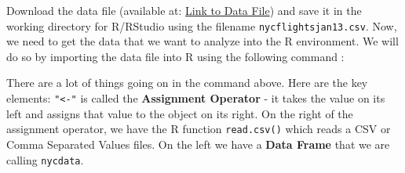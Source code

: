 \documentclass[11pt, letterpaper, twoside]{memoir}\usepackage{knitr}
\begin{document}
\begin{knitrout}
\color{fgcolor}\begin{kframe}
\begin{alltt}
\end{alltt}
\end{kframe}
\end{knitrout}

Download the data file (available at: \href{https://umich.box.com/s/xtpp98qygojc0fh14vhlvdr6nzsa47a2}{Link to Data File}) and save it in the working directory for R/RStudio using the filename \texttt{nycflightsjan13.csv}. Now, we need to get the data that we want to analyze into the R environment. We will do so by importing the data file into R using the following command :

\begin{knitrout}
\color{fgcolor}\begin{kframe}
\begin{alltt}
 \hlkwb{<-} \hlstd{(}\hlstd{)}
\end{alltt}
\end{kframe}
\end{knitrout}

There are a lot of things going on in the command above. Here are the key elements: \texttt{"<-"} is called the \textbf{Assignment Operator} - it takes the value on its left and assigns that value to the object on its right. On the right of the assignment operator, we have the R function \texttt{read.csv()} which reads a CSV or Comma Separated Values files. On the left we have a \textbf{Data Frame} that we are calling \texttt{nycdata}. 
\end{document}
